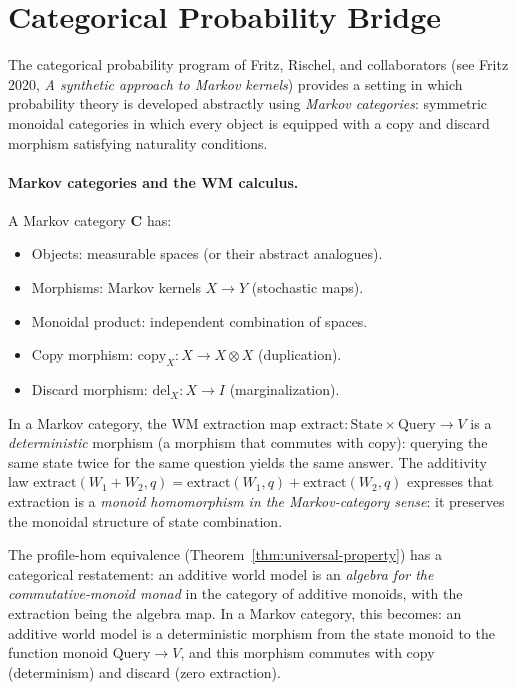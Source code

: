 \section{Categorical Probability Bridge}
\label{sec:bridge-categorical}

The categorical probability program of Fritz, Rischel, and
collaborators (see Fritz 2020, \emph{A synthetic approach to Markov
kernels}) provides a setting in which probability theory is developed
abstractly using \emph{Markov categories}: symmetric monoidal
categories in which every object is equipped with a copy and discard
morphism satisfying naturality conditions.

\paragraph{Markov categories and the WM calculus.}
A Markov category $\mathbf{C}$ has:
\begin{itemize}
\item Objects: measurable spaces (or their abstract analogues).
\item Morphisms: Markov kernels $X \to Y$ (stochastic maps).
\item Monoidal product: independent combination of spaces.
\item Copy morphism: $\mathrm{copy}_X : X \to X \otimes X$ (duplication).
\item Discard morphism: $\mathrm{del}_X : X \to I$ (marginalization).
\end{itemize}

\begin{definition}
\label{def:markov-cat-bridge}
In a Markov category, the WM extraction map
$\mathrm{extract} : \mathrm{State} \times \mathrm{Query} \to V$
is a \emph{deterministic} morphism (a morphism that commutes with
copy): querying the same state twice for the same question yields
the same answer.  The additivity law
$\mathrm{extract}(W_1 + W_2, q) = \mathrm{extract}(W_1, q) +
\mathrm{extract}(W_2, q)$ expresses that extraction is a
\emph{monoid homomorphism in the Markov-category sense}: it
preserves the monoidal structure of state combination.
\end{definition}

\begin{theorem}
\label{thm:markov-cat-hom}
The profile-hom equivalence (Theorem~\ref{thm:universal-property})
has a categorical restatement: an additive world model is an
\emph{algebra for the commutative-monoid monad} in the category of
additive monoids, with the extraction being the algebra map.  In a
Markov category, this becomes: an additive world model is a
deterministic morphism from the state monoid to the function monoid
$\mathrm{Query} \to V$, and this morphism commutes with copy
(determinism) and discard (zero extraction).
\end{theorem}

